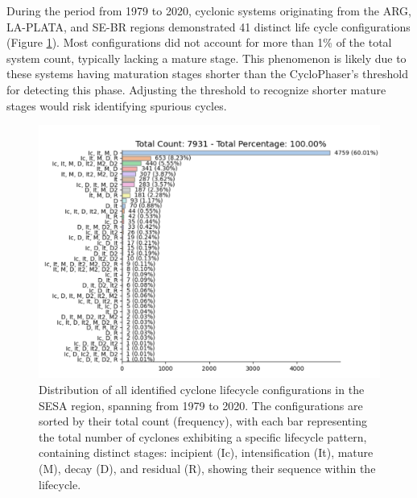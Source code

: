 During the period from 1979 to 2020, cyclonic systems originating from the ARG, LA-PLATA, and SE-BR regions demonstrated 41 distinct life cycle configurations (Figure \ref{fig:all_lifecycle_configurations}). Most configurations did not account for more than 1\% of the total system count, typically lacking a mature stage. This phenomenon is likely due to these systems having maturation stages shorter than the CycloPhaser's threshold for detecting this phase. Adjusting the threshold to recognize shorter mature stages would risk identifying spurious cycles.


\begin{figure}[ht]
    \centering
    \includegraphics[width=\textwidth]{figs_4/combined_barplots_total_all_systems.pdf}
    \caption[Life Cycle Configurations]{Distribution of all identified cyclone lifecycle configurations in the SESA region, spanning from 1979 to 2020. The configurations are sorted by their total count (frequency), with each bar representing the total number of cyclones exhibiting a specific lifecycle pattern, containing distinct stages: incipient (Ic), intensification (It), mature (M), decay (D), and residual (R), showing their sequence within the lifecycle.}
\label{fig:all_lifecycle_configurations}
\end{figure}

